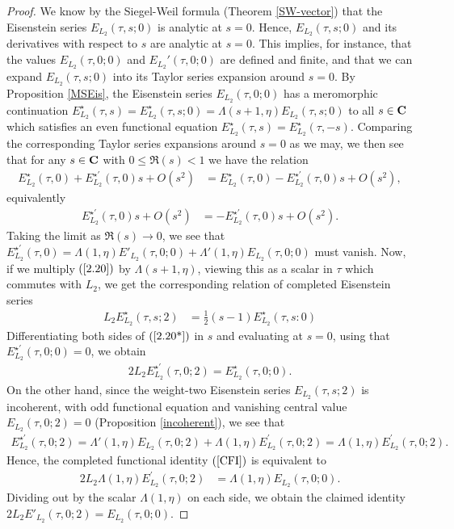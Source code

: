 \documentclass{amsart}
\theoremstyle{definition}
\begin{document}
\begin{proof}

We know by the Siegel-Weil formula (Theorem \ref{SW-vector}) 
that the Eisenstein series $E_{L_2}(\tau, s; 0)$ is analytic at $s=0$. Hence, $E_{L_2}(\tau, s; 0)$ 
and its derivatives with respect to $s$ are analytic at $s=0$. 
This implies, for instance, that the values $E_{L_2}(\tau, 0; 0)$ and $E_{L_2}'(\tau, 0; 0)$ are defined and finite,
and that we can expand $E_{L_2}(\tau, s;0)$ into its Taylor series expansion around $s=0$. 
By Proposition \ref{MSEis}, the Eisenstein series $E_{L_2}(\tau, 0; 0)$ has a meromorphic continuation 
$E_{L_2}^{\star}(\tau, s) = E_{L_2}^{\star}(\tau, s; 0) = \Lambda(s+1, \eta)E_{L_2}(\tau, s;0)$
to all $s \in {\bf{C}}$ which satisfies an even functional equation $E_{L_2}^{\star}(\tau, s) = E_{L_2}^{\star}(\tau, -s)$. 
Comparing the corresponding Taylor series expansions around $s = 0$ as we may, we then see
that for any $s \in {\bf{C}}$ with $0 \leq \Re(s) <1$ we have the relation 
\begin{align*} E_{L_2}^{\star}(\tau, 0) + E_{L_2}^{\star \prime}(\tau, 0) s + O(s^2) 
&= E_{L_2}^{\star}(\tau, 0) - E_{L_2}^{\star \prime}(\tau, 0) s + O(s^2), \end{align*}
equivalently 
\begin{align*} E_{L_2}^{\star \prime}(\tau, 0) s + O(s^2) &=  - E_{L_2}^{\star \prime}(\tau, 0) s + O(s^2). \end{align*}
Taking the limit as $\Re(s) \rightarrow 0$, we see that 
$E^{\star \prime}_{L_2}(\tau, 0)  = \Lambda(1, \eta) E'_{L_2}(\tau, 0; 0) + \Lambda'(1, \eta) E_{L_2}(\tau, 0;0)$ must vanish.
Now, if we multiply $(\ref{2.20})$ by $\Lambda(s+1, \eta)$, viewing this as a scalar in $\tau$ which commutes with $L_2$,
we get the corresponding relation of completed Eisenstein series 
\begin{align}\label{2.20*} L_2 E_{L_2}^{\star}(\tau, s; 2) &= \frac{1}{2}(s-1) E_{L_2}^{\star}(\tau, s: 0)\end{align}
Differentiating both sides of $(\ref{2.20*})$ in $s$ and evaluating at $s=0$, using that $E_{L_2}^{\star \prime}(\tau, 0; 0)=0$, we obtain 
\begin{align}\label{CFI} 2 L_2 E^{\star \prime}_{L_2}(\tau, 0; 2) = E_{L_2}^{\star}(\tau, 0; 0). \end{align}
On the other hand, since the weight-two Eisenstein series $E_{L_2}(\tau, s; 2)$ is incoherent, 
with odd functional equation and vanishing central value $E_{L_2}(\tau, 0; 2) = 0$ (Proposition \ref{incoherent}), we see that 
\begin{align*} E^{\star \prime}_{L_2}(\tau, 0;2) =\Lambda'(1,\eta)E_{L_2}(\tau, 0; 2) + \Lambda(1, \eta) E^{\prime}_{L_2}(\tau, 0; 2)
= \Lambda(1, \eta) E_{L_2}^{\prime}(\tau, 0; 2). \end{align*} Hence, the completed functional identity $(\ref{CFI})$ is equivalent to 
\begin{align*} 2 L_2 \Lambda(1, \eta) E^{\prime}_{L_2}(\tau, 0; 2) &= \Lambda(1, \eta) E_{L_2}(\tau, 0; 0). \end{align*}
Dividing out by the scalar $\Lambda(1, \eta)$ on each side, we obtain the claimed identity $2L_2 E'_{L_2}(\tau, 0; 2) = E_{L_2}(\tau, 0; 0)$. \end{proof}
\end{document}
